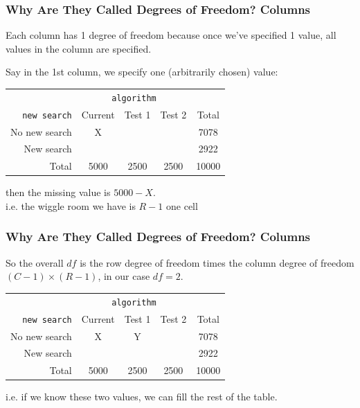 \documentclass[slides]{beamer}
\newcommand{\blue}[1]{\textcolor{blue2}{#1}}
\begin{document}
\begin{frame}
\frametitle{Why Are They Called Degrees of Freedom? Columns}

Each column has 1 degree of freedom because once we've specified 1 value, all values in the column are specified.  

\vspace{0.5cm}

Say in the 1st column, we specify one (arbitrarily chosen) value:  
\begin{center}
  \begin{tabular}{r|ccc|c}
& \multicolumn{3}{c|}{{\tt algorithm}} & \\
       {\tt new search} & Current & Test 1 & Test 2 & Total \\ 
\hline
    No new search & X &  &  & 7078 \\ 
    New search &  &  &  & 2922 \\ 
\hline
    Total & 5000 & 2500 & 2500 & 10000 \\ 
  \end{tabular}
\end{center}
\pause
then the missing value is $5000-X$.\\ 
i.e. the \blue{wiggle room} we have is $R-1$ one cell

\end{frame}


\begin{frame}
\frametitle{Why Are They Called Degrees of Freedom? Columns}

So the overall $df$ is the row degree of freedom times the column degree of freedom $(C-1)\times(R-1)$, in our case $df=2$.

\vspace{0.5cm}

\begin{center}
  \begin{tabular}{r|ccc|c}
& \multicolumn{3}{c|}{{\tt algorithm}} & \\
       {\tt new search} & Current & Test 1 & Test 2 & Total \\ 
\hline
    No new search & X & Y &  & 7078 \\ 
    New search &  &  &  & 2922 \\ 
\hline
    Total & 5000 & 2500 & 2500 & 10000 \\ 
  \end{tabular}
\end{center}
\pause
i.e. \blue{if we know these two values, we can fill the rest of the table.}

\end{frame}
\end{document}
